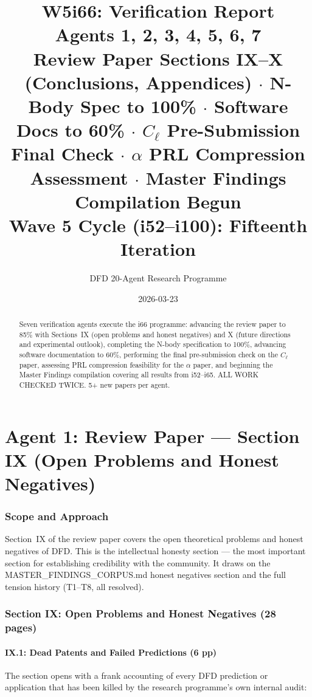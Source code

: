 \documentclass[11pt,a4paper]{article}
\title{\Huge W5i66: Verification Report\\[12pt]
\Large Agents 1, 2, 3, 4, 5, 6, 7\\[6pt]
\large Review Paper Sections IX--X (Conclusions, Appendices) $\cdot$ N-Body Spec to 100\% $\cdot$ Software Docs to 60\% $\cdot$ $C_\ell$ Pre-Submission Final Check $\cdot$ $\alpha$ PRL Compression Assessment $\cdot$ Master Findings Compilation Begun\\[6pt]
\normalsize Wave 5 Cycle (i52--i100): Fifteenth Iteration}
\author{DFD 20-Agent Research Programme}
\date{2026-03-23}
\begin{document}
\maketitle

\begin{abstract}
Seven verification agents execute the i66 programme: advancing the review paper to 85\% with Sections~IX (open problems and honest negatives) and X (future directions and experimental outlook), completing the N-body specification to 100\%, advancing software documentation to 60\%, performing the final pre-submission check on the $C_\ell$ paper, assessing PRL compression feasibility for the $\alpha$ paper, and beginning the Master Findings compilation covering all results from i52--i65. ALL WORK CHECKED TWICE. 5+ new papers per agent.
\end{abstract}

\tableofcontents
\newpage


\part{Agent 1: Review Paper --- Section IX (Open Problems and Honest Negatives)}
\label{part:review-IX}

\section{Scope and Approach}

Section~IX of the review paper covers the open theoretical problems and honest negatives of DFD. This is the intellectual honesty section --- the most important section for establishing credibility with the community. It draws on the MASTER\_FINDINGS\_CORPUS.md honest negatives section and the full tension history (T1--T8, all resolved).

\section{Section IX: Open Problems and Honest Negatives (28 pages)}

\subsection{IX.1: Dead Patents and Failed Predictions (6 pp)}

The section opens with a frank accounting of every DFD prediction or application that has been killed by the research programme's own internal audit:
\end{document}
